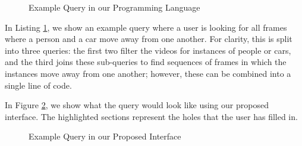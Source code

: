 \begin{figure}[H]
    \caption{Example Query in our Programming Language}
    \label{fig:Map1}
\end{figure}

In Listing \ref{fig:Map1}, we show an example query where a user is looking for all frames where a person and a car move away from one another. For clarity, this is split into three queries: the first two filter the videos for instances of people or cars, and the third joins these sub-queries to find sequences of frames in which the instances move away from one another; however, these can be combined into a single line of code.

In Figure \ref{fig:UI1}, we show what the query would look like using our proposed interface.
The highlighted sections represent the holes that the user has filled in.

\begin{figure}[H]
    \caption{Example Query in our Proposed Interface}
    \label{fig:UI1}
\end{figure}

